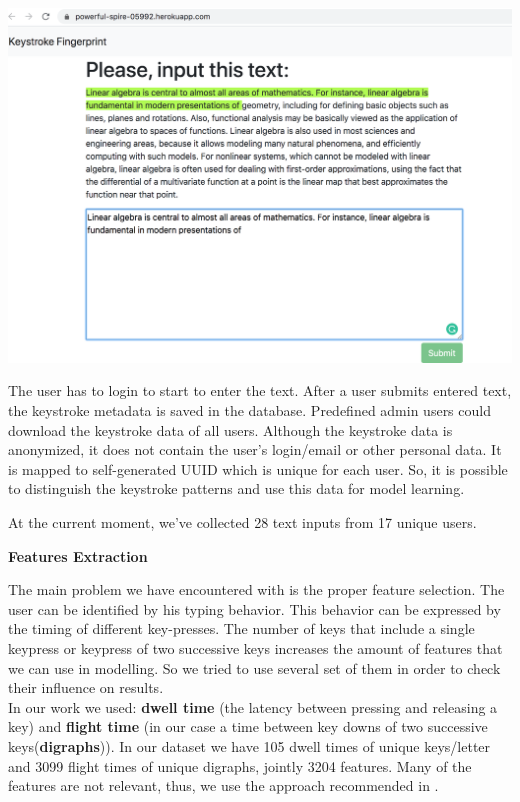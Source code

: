 \documentclass[12pt,a4]{article}
\begin{document}
\begin{center}
	\includegraphics[width=0.9\linewidth]{images/web-app.png}
	\label{fig:web-app.png}
\end{center}
The user has to login to start to enter the text. After a user submits entered text, the keystroke metadata is saved in the database.
Predefined admin users could download the keystroke data of all users. Although the keystroke data is anonymized, it does not contain the user's login/email or other personal data. It is mapped to self-generated UUID which is unique for each user. So, it is possible to distinguish the keystroke patterns and use this data for model learning.

At the current moment, we've collected 28 text inputs from 17 unique users.

\bigskip
\large\textbf{Features Extraction}
\bigskip

\normalsize

The main problem we have encountered with is the proper feature selection. The user can be identified by his typing behavior. This behavior can be expressed by the timing of different key-presses. The number of keys that include a single keypress or keypress of two successive keys increases the amount of features that we can use in modelling. So we tried to use several set of them in order to check their influence on results. \\

In our work we used: \textbf{dwell time} (the latency between pressing and releasing a key) and \textbf{flight time} (in our case a time between key downs of two successive keys(\textbf{digraphs})). In our dataset we have 105 dwell times of unique keys/letter and 3099 flight times of unique digraphs, jointly 3204 features. Many of the features are not relevant, thus, we use the approach recommended in \cite{tappert2012keystroke}. \\
\end{document}
